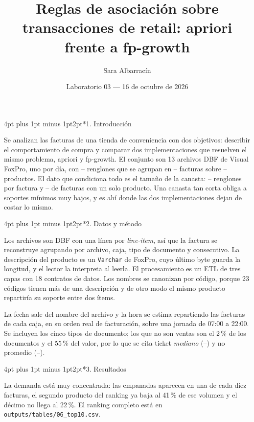 \documentclass[12pt,twocolumn]{article}
\title{\vspace{-1.3cm}\textbf{Reglas de asociación sobre transacciones de retail:
apriori frente a fp-growth}}
\author{Sara Albarracín}
\date{\vspace{-0.35cm}\small Laboratorio 03 --- 16 de octubre de 2026\vspace{-0.45cm}}
\makeatletter
\renewcommand\section{\@startsection{section}{1}{\z@}
  {4pt plus 1pt minus 1pt}{2pt}{\normalfont\large\bfseries}}
\providecommand{\cifraRenglones}{--}\providecommand{\cifraFacturas}{--}
\providecommand{\cifraProductos}{--}\providecommand{\cifraCanasta}{--}
\providecommand{\cifraUnitarias}{--}\providecommand{\cifraTicketMediano}{--}
\providecommand{\cifraTicketPromedio}{--}\providecommand{\cifraChiCuadrado}{--}
\makeatother
\begin{document}
\maketitle

\section*{1. Introducción}

Se analizan las facturas de una tienda de conveniencia con dos objetivos: describir el
comportamiento de compra y comparar dos implementaciones que resuelven el mismo
problema, apriori y fp-growth. El conjunto son 13 archivos DBF de Visual FoxPro, uno
por día, con \cifraRenglones{} renglones que se agrupan en \cifraFacturas{} facturas
sobre \cifraProductos{} productos. El dato que condiciona todo es el tamaño de la
canasta: \cifraCanasta{} renglones por factura y \cifraUnitarias{} de facturas con un
solo producto. Una canasta tan corta obliga a soportes mínimos muy bajos, y es ahí
donde las dos implementaciones dejan de costar lo mismo.

\section*{2. Datos y método}

Los archivos son DBF con una línea por \emph{line-item}, así que la factura se
reconstruye agrupando por archivo, caja, tipo de documento y consecutivo. La descripción
del producto es un \texttt{Varchar} de FoxPro, cuyo último byte guarda la longitud, y el
lector la interpreta al leerla. El procesamiento es un ETL de tres capas con 18
contratos de datos.
Los nombres se canonizan por código, porque 23 códigos tienen más de una descripción y
de otro modo el mismo producto repartiría su soporte entre dos ítems.

La fecha sale del nombre del archivo y la hora se estima repartiendo las facturas de cada
caja, en su orden real de facturación, sobre una jornada de 07:00 a 22:00. Se incluyen
los cinco tipos de documento; los que no son ventas son el 2\,\% de los documentos y el
55\,\% del valor, por lo que se cita ticket \emph{mediano} (\cifraTicketMediano{}) y no
promedio (\cifraTicketPromedio{}).

\section*{3. Resultados}

La demanda está muy concentrada: las empanadas aparecen en una de cada diez facturas,
el segundo producto del ranking ya baja al 41\,\% de ese volumen y el décimo no llega al
22\,\%. El ranking completo está en \texttt{outputs/tables/06\_top10.csv}.
\end{document}
